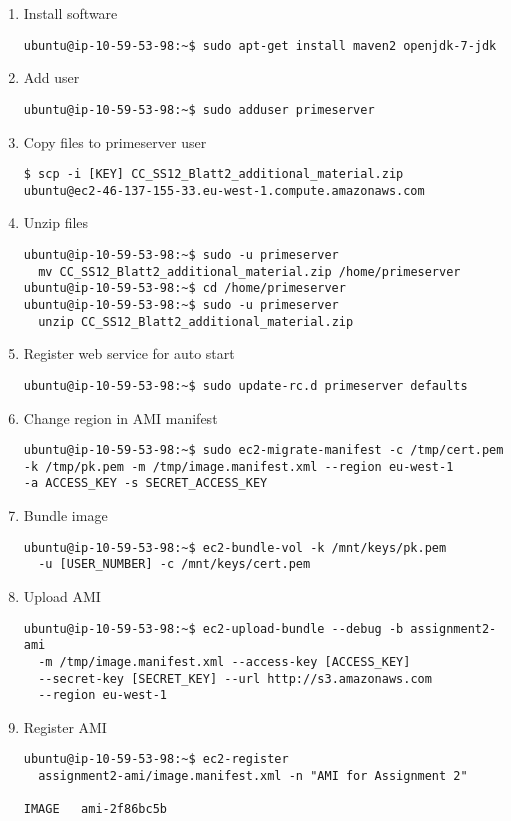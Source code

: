 \documentclass{article}
\begin{document}
\begin{enumerate}
	\item Install software
\begin{verbatim}
ubuntu@ip-10-59-53-98:~$ sudo apt-get install maven2 openjdk-7-jdk
\end{verbatim}

	\item Add user
\begin{verbatim}
ubuntu@ip-10-59-53-98:~$ sudo adduser primeserver
\end{verbatim}

	\item Copy files to primeserver user
\begin{verbatim}
$ scp -i [KEY] CC_SS12_Blatt2_additional_material.zip 
ubuntu@ec2-46-137-155-33.eu-west-1.compute.amazonaws.com
\end{verbatim}

	\item Unzip files
\begin{verbatim}
ubuntu@ip-10-59-53-98:~$ sudo -u primeserver 
  mv CC_SS12_Blatt2_additional_material.zip /home/primeserver
ubuntu@ip-10-59-53-98:~$ cd /home/primeserver
ubuntu@ip-10-59-53-98:~$ sudo -u primeserver 
  unzip CC_SS12_Blatt2_additional_material.zip
\end{verbatim}

	\item Register web service for auto start
\begin{verbatim}
ubuntu@ip-10-59-53-98:~$ sudo update-rc.d primeserver defaults
\end{verbatim}

	\item Change region in AMI manifest
\begin{verbatim}
ubuntu@ip-10-59-53-98:~$ sudo ec2-migrate-manifest -c /tmp/cert.pem 
-k /tmp/pk.pem -m /tmp/image.manifest.xml --region eu-west-1 
-a ACCESS_KEY -s SECRET_ACCESS_KEY
\end{verbatim}

	\item Bundle image
\begin{verbatim}
ubuntu@ip-10-59-53-98:~$ ec2-bundle-vol -k /mnt/keys/pk.pem 
  -u [USER_NUMBER] -c /mnt/keys/cert.pem
\end{verbatim}

	\item Upload AMI
\begin{verbatim}
ubuntu@ip-10-59-53-98:~$ ec2-upload-bundle --debug -b assignment2-ami 
  -m /tmp/image.manifest.xml --access-key [ACCESS_KEY] 
  --secret-key [SECRET_KEY] --url http://s3.amazonaws.com
  --region eu-west-1
\end{verbatim}

	\item Register AMI
\begin{verbatim}
ubuntu@ip-10-59-53-98:~$ ec2-register 
  assignment2-ami/image.manifest.xml -n "AMI for Assignment 2"

IMAGE	ami-2f86bc5b
\end{verbatim}
\end{enumerate}
\end{document}
